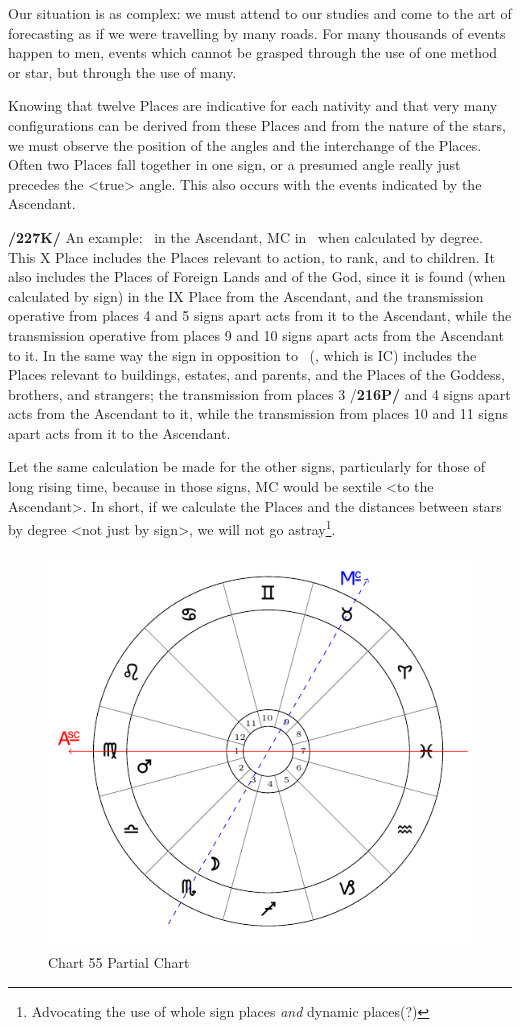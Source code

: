 Our situation is as complex: we must attend to our studies and come to the art of forecasting as if we were travelling by many roads. For many thousands of events happen to men, events which cannot be
grasped through the use of one method or star, but through the use of many. 

Knowing that twelve Places are indicative for each nativity and that very many configurations can be derived from these Places and from
the nature of the stars, we must observe the position of the angles and the interchange of the Places. Often two Places fall together in one sign, or a presumed angle really just precedes the <true> angle. This also occurs with the events indicated by the Ascendant.

\textbf{/227K/} An example: \Gemini\, in the Ascendant, MC in \Aquarius\, when calculated by degree. This X Place includes the Places relevant to action, to rank, and to children. It also includes the Places of Foreign Lands and of the God, since it is found (when calculated by sign) in the IX Place from the Ascendant, and the transmission operative from places 4 and 5 signs apart acts from it to the Ascendant, while the transmission operative from places 9 and 10 signs apart acts from the Ascendant to it. In the same way the
sign in opposition to \Aquarius\, (\Leo, which is IC) includes the Places relevant to buildings, estates, and parents, and the Places of the Goddess, brothers, and strangers; the transmission from places 3 /\textbf{216P/} and 4 signs apart acts from the Ascendant to it, while the transmission from places 10 and 11 signs apart acts from it to the Ascendant. 

Let the same calculation be made for the other signs, particularly for those of long rising time, because in those signs, MC would be sextile <to the Ascendant>. In short, if we calculate the Places and the distances between stars by degree <not just by sign>, we will not go astray\footnote{Advocating the use of whole sign places \textsl{and} dynamic places(?)}.

\begin{figure}
\centering
\vspace{-20pt}
\includegraphics[width=.68\textwidth]{charts/5_09_2}
\caption{Chart 55 Partial Chart}
\label{fig:chart55}
\end{figure}

